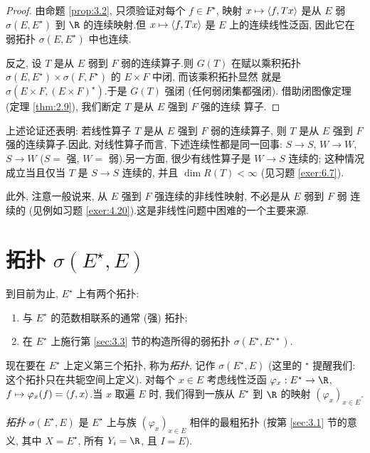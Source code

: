 \begin{proof}
由命题  \ref{prop:3.2}, 只须验证对每个 $f\in F^\star$, 映射
$x\mapsto\left\langle f,Tx\right\rangle$ 是从 $E$ 弱 $\sigma(E,E^\star)$ 到 $\R$ 的连续映射.但
$x\mapsto\left\langle f,Tx\right\rangle$ 是 $E$ 上的连续线性泛函, 因此它在弱拓扑
$\sigma(E,E^\star)$ 中也连续.

反之, 设 $T$ 是从 $E$ 弱到 $F$ 弱的连续算子.则 $G(T)$ 在赋以乘积拓扑
$\sigma(E,E^\star)\times\sigma(F,F^\star)$ 的 $E\times F$ 中闭, 而该乘积拓扑显然
就是 $\sigma(E\times F,(E\times F)^\star)$.于是 $G(T)$ 强闭 (任何弱闭集都强闭).
借助闭图像定理 (定理  \ref{thm:2.9}), 我们断定 $T$ 是从 $E$ 强到 $F$ 强的连续
算子.
\end{proof}

\begin{remark}
\label{rem:3.7}
上述论证还表明: 若线性算子 $T$ 是从 $E$ 强到 $F$ 弱的连续算子, 则 $T$ 是从 $E$
强到 $F$ 强的连续算子.因此, 对线性算子而言, 下述连续性都是同一回事:
$S\to S$, $W\to W$, $S\to W$ ($S=$ 强, $W=$ 弱).另一方面, 很少有线性算子是
$W\to S$ 连续的; 这种情况成立当且仅当 $T$ 是 $S\to S$ 连续的, 并且
$\dim R(T)<\infty$ (见习题  \ref{exer:6.7}).

此外, 注意一般说来, 从 $E$ 强到 $F$ 强连续的非线性映射, 不必是从 $E$ 弱到 $F$ 弱
连续的 (见例如习题  \ref{exer:4.20}).这是非线性问题中困难的一个主要来源.
\end{remark}

\section{\texorpdfstring{\wstar{}拓扑 $\sigma(E^\star,E)$}{弱*拓扑 $\sigma(E^\star,E)$}}
\label{sec:3.4}

到目前为止, $E^\star$ 上有两个拓扑:
\begin{enumerate}[label=(\alph*), leftmargin=2.0em, itemsep=0.15em]
	\item 与 $E^\star$ 的范数相联系的通常 (强) 拓扑;
	\item 在 $E^\star$ 上施行第  \ref{sec:3.3} 节的构造所得的弱拓扑
	      $\sigma(E^\star,E^{\star\star})$.
\end{enumerate}
现在要在 $E^\star$ 上定义第三个拓扑, 称为\emph{\wstar{}拓扑}, 记作
$\sigma(E^\star,E)$ (这里的 $^\star$ 提醒我们: 这个拓扑只在共轭空间上定义).
对每个 $x\in E$ 考虑线性泛函 $\varphi_x:E^\star\to\R$,
$f\mapsto\varphi_x(f)=\left\langle f,x\right\rangle$.当 $x$ 取遍 $E$ 时, 我们得到一族从 $E^\star$
到 $\R$ 的映射 $(\varphi_x)_{x\in E}$.

\begin{definition}
\emph{\wstar{}拓扑} $\sigma(E^\star,E)$ 是 $E^\star$ 上与族 $(\varphi_x)_{x\in E}$
相伴的最粗拓扑 (按第  \ref{sec:3.1} 节的意义, 其中 $X=E^\star$, 所有 $Y_i=\R$,
且 $I=E$).
\end{definition}

